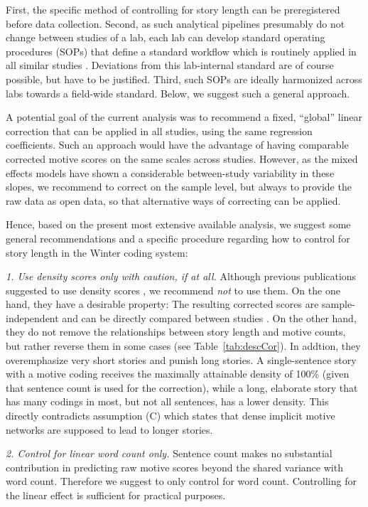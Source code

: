 \documentclass[man,a4paper,mask]{apa6}
\begin{document}
{First, the specific method of controlling for story length can be preregistered before data collection. Second, as such analytical pipelines presumably do not change between studies of a lab, each lab can develop standard operating procedures (SOPs) that define a standard workflow which is routinely applied in all similar studies \parencite{lin_StandardOperatingProcedures_2016}. Deviations from this lab-internal standard are of course possible, but have to be justified. Third, such SOPs are ideally harmonized across labs towards a field-wide standard. Below, we suggest such a general approach.

A potential goal of the current analysis was to recommend a fixed, ``global'' linear correction that can be applied in all studies, using the same regression coefficients. Such an approach would have the advantage of having comparable corrected motive scores on the same scales across studies. However, as the mixed effects models have shown a considerable between-study variability in these slopes, we recommend to correct on the sample level, but always to provide the raw data as open data, so that alternative ways of correcting can be applied.

Hence, based on the present most extensive available analysis, we suggest some general recommendations and a specific procedure regarding how to control for story length in the Winter coding system:

\emph{1. Use density scores only with caution, if at all.} Although previous publications suggested to use density scores \parencite[e.g., ][]{winter_MeasuringPersonalityDistance_1991}, we recommend \emph{not} to use them. On the one hand, they have a desirable property: The resulting corrected scores are sample-independent and can be directly compared between studies \parencite{schultheiss_MeasuringImplicitMotives_2007}. On the other hand, they do not remove the relationships between story length and motive counts, but rather reverse them in some cases (see Table~\ref{tab:descCor}). In addtion, they overemphasize very short stories and punish long stories. A single-sentence story with a motive coding receives the maximally attainable density of 100\% (given that sentence count is used for the correction), while a long, elaborate story that has many codings in most, but not all sentences, has a lower density. This directly contradicts assumption (C) which states that dense implicit motive networks are supposed to lead to longer stories.

\emph{2. Control for linear word count only.} Sentence count makes no substantial contribution in predicting raw motive scores beyond the shared variance with word count. Therefore we suggest to only control for word count. Controlling for the linear effect is sufficient for practical purposes.

}
\end{document}
